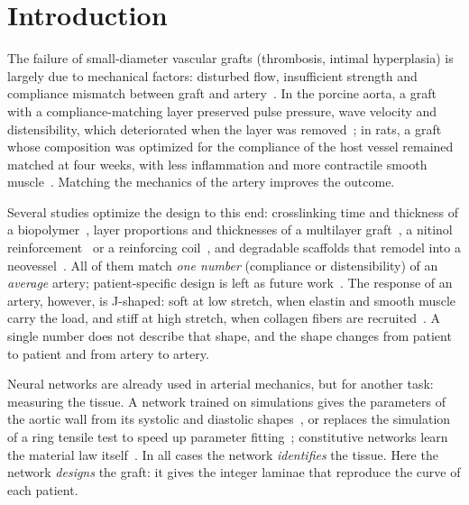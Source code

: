 \section{Introduction}
The failure of small-diameter vascular grafts (thrombosis, intimal hyperplasia) is largely due to mechanical factors: disturbed flow, insufficient strength and compliance mismatch between graft and artery~\cite{ding}. In the porcine aorta, a graft with a compliance-matching layer preserved pulse pressure, wave velocity and distensibility, which deteriorated when the layer was removed~\cite{rovas25}; in rats, a graft whose composition was optimized for the compliance of the host vessel remained matched at four weeks, with less inflammation and more contractile smooth muscle~\cite{furdella}. Matching the mechanics of the artery improves the outcome.

Several studies optimize the design to this end: crosslinking time and thickness of a biopolymer~\cite{harrison}, layer proportions and thicknesses of a multilayer graft~\cite{tamimi}, a nitinol reinforcement~\cite{rovas23} or a reinforcing coil~\cite{jiang}, and degradable scaffolds that remodel into a neovessel~\cite{szafron,hsu}. All of them match \emph{one number} (compliance or distensibility) of an \emph{average} artery; patient-specific design is left as future work~\cite{harrison,rovas23}. The response of an artery, however, is J-shaped: soft at low stretch, when elastin and smooth muscle carry the load, and stiff at high stretch, when collagen fibers are recruited~\cite{holzapfel,humphrey}. A single number does not describe that shape, and the shape changes from patient to patient and from artery to artery.

Neural networks are already used in arterial mechanics, but for another task: measuring the tissue. A network trained on simulations gives the parameters of the aortic wall from its systolic and diastolic shapes~\cite{liuml}, or replaces the simulation of a ring tensile test to speed up parameter fitting~\cite{utrera}; constitutive networks learn the material law itself~\cite{linka,vervenne}. In all cases the network \emph{identifies} the tissue. Here the network \emph{designs} the graft: it gives the integer laminae that reproduce the curve of each patient.

